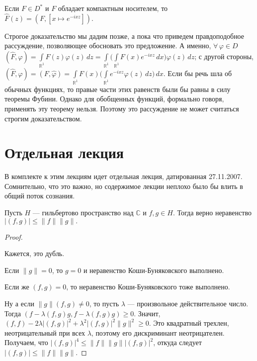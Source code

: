\documentclass[10pt]{article}
\begin{document}
\begin{prop}
Если $F\in D^*$ и $F$ обладает компактным носителем, то
$\hat{F}(z)=(F,[x\mapsto e^{-ixz}])$.
\end{prop}

Строгое доказательство мы дадим позже, а пока что приведем
правдоподобное рассуждение, позволяющее обосновать это предложение.
А именно, $\forall\,\varphi\in
D$\;\;$(\hat{F},\varphi)=\int\limits_{\mathbb{R}^1}\!\hat{F}(z)\varphi(z)\,dz=
\int\limits_{\mathbb{R}^1}\!\Big(\int\limits_{\mathbb{R}^1}\!F(x)e^{-ixz}\,dx\Big)\varphi(z)\,dz$;
с другой стороны,
$(\hat{F},\varphi)=(F,\hat{\varphi})=\int\limits_{\mathbb{R}^1}\!F(x)\Big(\int\limits_{\mathbb{R}^1}\!
e^{-ixz}\varphi(z)\,dz\Big)\,dx$. Если бы речь шла об обычных
функциях, то правые части этих равенств были бы равны в силу теоремы
Фубини. Однако для обобщенных функций, формально говоря, применять
эту теорему нельзя. Поэтому это рассуждение не может считаться
строгим доказательством.
\section{Отдельная лекция}
\begin{petit}
  В комплекте к этим лекциям идет отдельная лекция, датированная
  27.11.2007. Сомнительно, что это важно, но содержимое лекции неплохо
  было бы влить в общий поток сознания.
\end{petit}

\begin{theorem}
Пусть $H$ --- гильбертово пространство над $\mathbb{C}$ и $f,g\in
H$. Тогда верно неравенство $|(f,g)|\leqslant \|f\|\|g\|.$
\end{theorem}
\begin{proof}
  \begin{petit}
    Кажется, это дубль.
  \end{petit}
  Если $\|g\|=0$, то $g=0$ и неравенство Коши-Буняковского
  выполнено.

  Если же $(f,g)=0$, то неравенство Коши-Буняковского тоже
  выполнено.

  Ну а если $\|g\|(f,g)\neq0$, то пусть $\lambda$ --- произвольное
  действительное число. Тогда
  $(f-\lambda(f,g)g,f-\lambda(f,g)g)\geqslant 0.$ Значит,
  $(f,f)-2\lambda|(f,g)|^2+\lambda^2|(f,g)|^2\|g\|^2\geqslant0.$ Это
  квадратный трехлен, неотрицательный при всех $\lambda$, поэтому его
  дискриминант неотрицателен. Получаем, что $|(f,g)|^4\leqslant
  \|f\|\|g\||(f,g)|^2$, откуда следует $|(f,g)|\leqslant \|f\|\|g\|.$
\end{proof}
\end{document}
